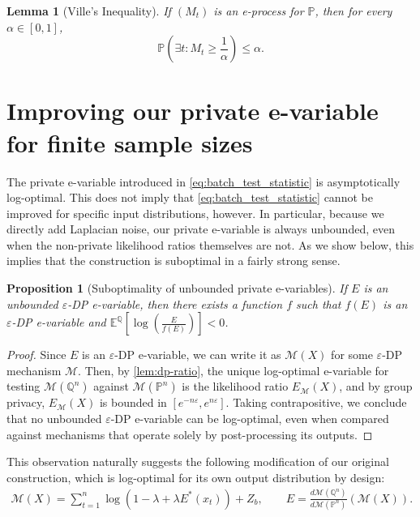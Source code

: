 \documentclass{article}
\newcommand{\Null}{\mathbb{P}}
\newcommand{\E}{\mathbb{E}}
\newcommand{\Alt}{\mathbb{Q}}
\newcommand{\M}{\mathcal{M}}
\newcommand{\eps}{\varepsilon}
\newtheorem{lemma}{Lemma}[theorem]
\newtheorem{proposition}{Proposition}[section]
\begin{document}
\begin{lemma}[Ville's Inequality]
    If $(M_t)$ is an e-process for $\Null$, then for every $\alpha \in [0,1]$,
    \begin{equation*}
        \Null\left( \exists t: M_t \geq \frac{1}{\alpha}\right) \leq \alpha.
    \end{equation*}
\end{lemma}


\section{Improving our private e-variable for finite sample sizes}\label{app:constants}

The private e-variable introduced in \cref{eq:batch_test_statistic} is asymptotically log-optimal. This does not imply that \cref{eq:batch_test_statistic} cannot be improved for specific input distributions, however. In particular, because we directly add Laplacian noise, our private e-variable is always unbounded, even when the non-private likelihood ratios themselves are not. As we show below, this implies that the construction is suboptimal in a fairly strong sense.

\begin{proposition}[Suboptimality of unbounded private e-variables]\label{prop:suboptimality}
    If $E$ is an unbounded $\varepsilon$-DP e-variable, then there exists a function $f$ such that $f(E)$ is an $\eps$-DP e-variable and $\E^\Alt[\log(\frac{E}{f(E)})] < 0$.
\end{proposition}

\begin{proof}    
    Since $E$ is an $\eps$-DP e-variable, we can write it as $\M(X)$ for some $\eps$-DP mechanism $\M$. Then, by \cref{lem:dp-ratio}, the unique log-optimal e-variable for testing $\M(\Alt^n)$ against $\M(\Null^n)$ is the likelihood ratio $E_\M(X)$, and by group privacy, $E_\M(X)$ is bounded in $[e^{-n\varepsilon}, e^{n\varepsilon}]$. Taking contrapositive, we conclude that no unbounded $\varepsilon$-DP e-variable can be log-optimal, even when compared against mechanisms that operate solely by post-processing its outputs.
\end{proof}


This observation naturally suggests the following modification of our original construction, which is log-optimal for its own output distribution by design:
\begin{align}
    \M(X) =  \sum_{t = 1}^n \log (1-\lambda+\lambda  E^*(x_t)) + Z_b,  \qquad E = \frac{d\M(\Alt^n)}{d\M(\Null^n)}(\M(X)).
\end{align}
\end{document}
